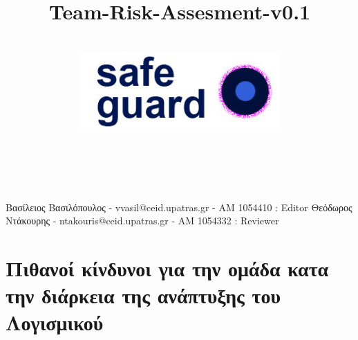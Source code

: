 \documentclass{article}
\title{Team-Risk-Assesment-v0.1}
\author{\\
\includegraphics[width=3in]{safeguard}\\[1ex]\\\\
}
\begin{document}
\maketitle

\clearpage

Βασίλειος Βασιλόπουλος - vvasil@ceid.upatras.gr - ΑΜ 1054410 : Editor
Θεόδωρος Ντάκουρης - ntakouris@ceid.upatras.gr - ΑΜ 1054332 : Reviewer

\renewcommand{\contentsname}{Περιεχόμενα}
\tableofcontents

\newpage

\section{Πιθανοί κίνδυνοι για την ομάδα κατα την διάρκεια της ανάπτυξης του Λογισμικού}
    
\end{document}
